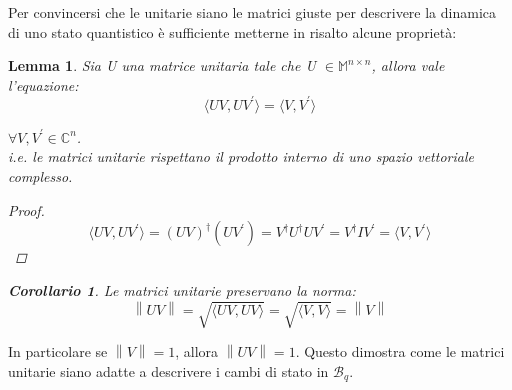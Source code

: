 \documentclass[12pt,a4paper,openright]{report}
\newcommand{\norm}[1]{\left\lVert#1\right\rVert}
\newtheorem{mylem}{Lemma}
\newtheorem*{mycor}{Corollario}
\begin{document}
Per convincersi che le unitarie siano le matrici giuste per descrivere la dinamica di uno stato quantistico è sufficiente metterne in risalto alcune proprietà:
\newpage
\begin{mylem}
    Sia U una matrice unitaria tale che U $\in \mathbb{M}^{n\times{n}}$, allora vale l'equazione:
    \[
        \langle{UV,UV^{'}}\rangle = \langle{V,V^{'}}\rangle 
    \]
    
  $\forall V,V^{'} \in \mathbb{C}^n$.\\
  i.e. le matrici unitarie rispettano il prodotto interno di uno spazio vettoriale complesso.
  \begin{proof}
      \[
        \langle{UV,UV^{'}}\rangle = (UV)^{\dag}(UV^{'}) = V^{\dag}U^{\dag}UV^{'} = V^{\dag}IV^{'} = \langle{V,V^{'}}\rangle
      \]
  \end{proof}
  \begin{mycor}
      Le matrici unitarie preservano la norma:
      \[
            \norm{UV} = \sqrt{\langle{UV,UV}\rangle} = \sqrt{\langle{V,V}\rangle} = \norm{V} 
      \]
   \end{mycor}
  
\end{mylem}

In particolare se $\norm{V}=1$, allora $\norm{UV}=1$. Questo dimostra come le matrici unitarie siano adatte a descrivere i cambi di stato in $\mathcal{B}_q$.\par
\end{document}
